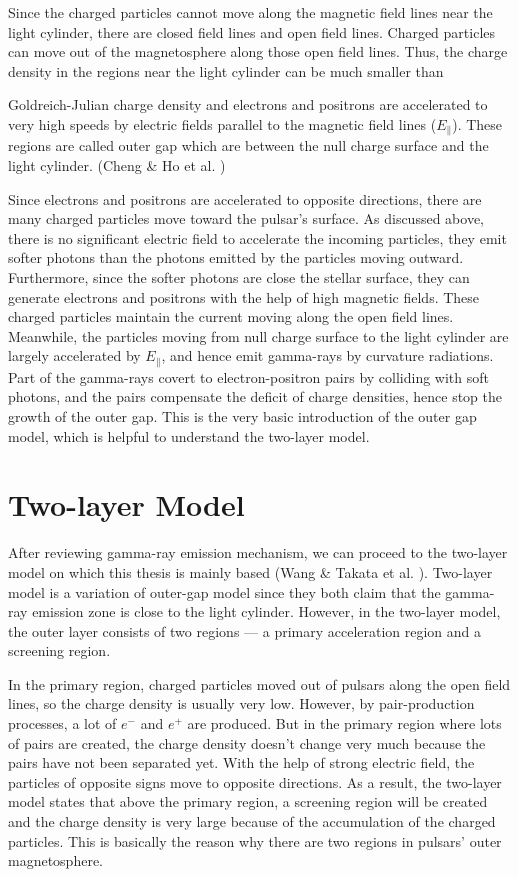\documentclass[12pt]{report}
\newcommand{\gj}[0]{
  Goldreich-Julian charge density
}
\begin{document}
    Since the charged particles cannot move along the magnetic field lines near 
    the light cylinder, there are closed field lines and open field lines. Charged 
    particles can move out of the magnetosphere along those open field lines. Thus, the 
    charge density in the regions near the light cylinder can be much smaller than 
    \gj{} and electrons and positrons are accelerated to very high speeds by electric 
    fields parallel to the magnetic field lines ($E_{\parallel}$). These regions are called 
    outer gap which are between the null charge surface and the light cylinder.
    (Cheng \& Ho et al. \cite{1986ApJ...300..500C}) 
    
    Since electrons and positrons are accelerated to opposite directions, there are many 
    charged particles move toward the pulsar's surface. As discussed above, there is no 
    significant electric field to accelerate the incoming particles, they emit softer 
    photons than the photons emitted by the particles moving outward. Furthermore, since the 
    softer photons are close the stellar surface, they can generate electrons and 
    positrons with the help of high magnetic fields. These charged particles maintain the current 
    moving along the open field lines. Meanwhile, the particles moving from null charge 
    surface to the light cylinder are largely accelerated by $E_{\parallel}$, and hence 
    emit gamma-rays by curvature radiations. Part of the gamma-rays covert to
    electron-positron pairs by colliding with soft photons, and the pairs compensate 
    the deficit of charge densities, hence stop the growth of the outer gap. This is the 
    very basic introduction of the outer gap model, which is helpful to understand the 
    two-layer model. 
        
  \section{Two-layer Model}
    After reviewing gamma-ray emission mechanism, we can proceed to
    the two-layer model on which this thesis is mainly based (Wang \& Takata et al. 
    \cite{0004-637X-720-1-178}). Two-layer model is a variation of outer-gap model since they 
    both claim that the gamma-ray emission zone is close to the light cylinder. However, in the 
    two-layer model, the outer layer consists of two regions --- a primary acceleration region 
    and a screening region. 

    In the primary region, charged particles moved out of pulsars along the open field 
    lines, so the charge density is usually very low. 
    However, by pair-production processes, a lot of $e^{-}$ and $e^{+}$ are produced. 
    But in the primary region where lots of pairs are created, the charge density 
    doesn't change very much because the pairs have not been separated yet. With the help 
    of strong electric field, the particles of opposite signs move to opposite directions. 
    As a result, the two-layer model states that above the primary region, a screening 
    region will be created and the charge density is very large because of the accumulation 
    of the charged particles. This is basically the reason why there are two regions in 
    pulsars' outer magnetosphere.
\end{document}
